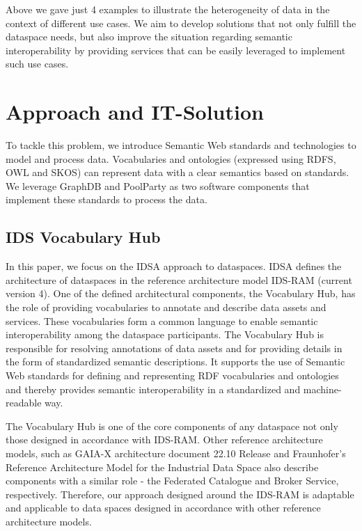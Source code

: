 \documentclass[
  super,
  preprint,
  3p]{elsarticle}
\begin{document}
Above we gave just 4 examples to illustrate the heterogeneity of data in
the context of different use cases. We aim to develop solutions that not
only fulfill the dataspace needs, but also improve the situation
regarding semantic interoperability by providing services that can be
easily leveraged to implement such use cases.

\section{Approach and IT-Solution}\label{approach-and-it-solution}

To tackle this problem, we introduce Semantic Web standards and
technologies to model and process data. Vocabularies and ontologies
(expressed using RDFS, OWL and SKOS) can represent data with a clear
semantics based on standards. We leverage GraphDB and PoolParty as two
software components that implement these standards to process the data.

\subsection{IDS Vocabulary Hub}\label{ids-vocabulary-hub}

In this paper, we focus on the IDSA approach to dataspaces. IDSA defines
the architecture of dataspaces in the reference architecture model
IDS-RAM (current version 4). One of the defined architectural
components, the Vocabulary Hub, has the role of providing vocabularies
to annotate and describe data assets and services. These vocabularies
form a common language to enable semantic interoperability among the
dataspace participants. The Vocabulary Hub is responsible for resolving
annotations of data assets and for providing details in the form of
standardized semantic descriptions. It supports the use of Semantic Web
standards for defining and representing RDF vocabularies and ontologies
and thereby provides semantic interoperability in a standardized and
machine-readable way.

The Vocabulary Hub is one of the core components of any dataspace not
only those designed in accordance with IDS-RAM. Other reference
architecture models, such as GAIA-X architecture document 22.10 Release
\citep{GaiaXArchitectureDocument2022} and Fraunhofer's Reference
Architecture Model for the Industrial Data Space
\citep{ReferenceArhictectureModel2017} also describe components with a
similar role - the Federated Catalogue and Broker Service, respectively.
Therefore, our approach designed around the IDS-RAM is adaptable and
applicable to data spaces designed in accordance with other reference
architecture models.
\end{document}
